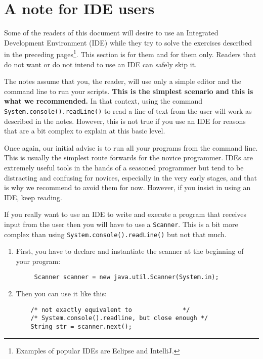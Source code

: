 
\section{A note for IDE users}
\label{sec:note-ide-users}

Some of the readers of this document will desire to use an Integrated
Development Environment (IDE) while they try to solve the exercises
described in the preceding 
pages\footnote{Examples of popular IDEs are Eclipse and IntelliJ. }. 
This section is for them and for
them only. Readers that do not want or do not intend to use an IDE can
safely skip it. 

The notes assume that you, the reader, will use 
only a simple editor and the command line to run your scripts. 
\textbf{This is the simplest scenario
and this is what we recommended.} 
In that context, using the command
\verb+System.console().readLine()+ to read a line of text from the
user will work as described in the notes. However, this is not true if
you use an IDE for reasons that are a bit complex to explain at this
basic level.

Once again, our initial advise is to run all your programs from the
command line. This is usually the simplest route forwards for the
novice programmer. IDEs are extremely useful tools in the hands of a
seasoned programmer but tend to be distracting and confusing for
novices, especially in the very early stages, and that is why we
recommend to avoid them for now. However, if you insist in using an
IDE, keep reading. 

If you really want to use an IDE to write and execute a program that
receives input from the user then you will have to use a
\verb+Scanner+. This is a bit more complex than using
\verb+System.console().readLine()+ but not that much.

\begin{enumerate}
\item First, you have to declare and instantiate the scanner at the
beginning of your program:

\begin{verbatim}
     Scanner scanner = new java.util.Scanner(System.in);
\end{verbatim}

\item Then you can use it like this:

\begin{verbatim}
    /* not exactly equivalent to              */
    /* System.console().readline, but close enough */
    String str = scanner.next();
\end{verbatim}

\end{enumerate}


